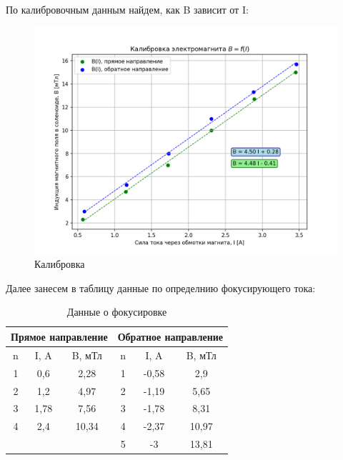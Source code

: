 \documentclass[a4paper, 12pt]{article}
\begin{document}
По калибровочным данным найдем, как B зависит от I:
\begin{figure}[H]
    \centering
    \includegraphics[width=1\textwidth]{calib.png}
    \caption{Калибровка}
    \label{fig:calib}
\end{figure}
Далее занесем в таблицу данные по определнию фокусирующего тока:
\begin{table}[H]
	\centering
	\begin{tabular}{|ccc|ccc|}
	\hline
	\multicolumn{3}{|c|}{Прямое направление}                     & \multicolumn{3}{c|}{Обратное направление}                    \\ \hline
	\multicolumn{1}{|c|}{n} & \multicolumn{1}{c|}{I, A} & B, мТл & \multicolumn{1}{c|}{n} & \multicolumn{1}{c|}{I, A}  & B, мТл \\ \hline
	\multicolumn{1}{|c|}{1} & \multicolumn{1}{c|}{0,6}  & 2,28   & \multicolumn{1}{c|}{1} & \multicolumn{1}{c|}{-0,58} & 2,9    \\ \hline
	\multicolumn{1}{|c|}{2} & \multicolumn{1}{c|}{1,2}  & 4,97   & \multicolumn{1}{c|}{2} & \multicolumn{1}{c|}{-1,19} & 5,65   \\ \hline
	\multicolumn{1}{|c|}{3} & \multicolumn{1}{c|}{1,78} & 7,56   & \multicolumn{1}{c|}{3} & \multicolumn{1}{c|}{-1,78} & 8,31   \\ \hline
	\multicolumn{1}{|c|}{4} & \multicolumn{1}{c|}{2,4}  & 10,34  & \multicolumn{1}{c|}{4} & \multicolumn{1}{c|}{-2,37} & 10,97  \\ \hline
	\multicolumn{1}{|c|}{}  & \multicolumn{1}{c|}{}     &        & \multicolumn{1}{c|}{5} & \multicolumn{1}{c|}{-3}    & 13,81  \\ \hline
	\end{tabular}
	\caption{Данные о фокусировке}
	\label{tab:data_2}
\end{table}
\end{document}
